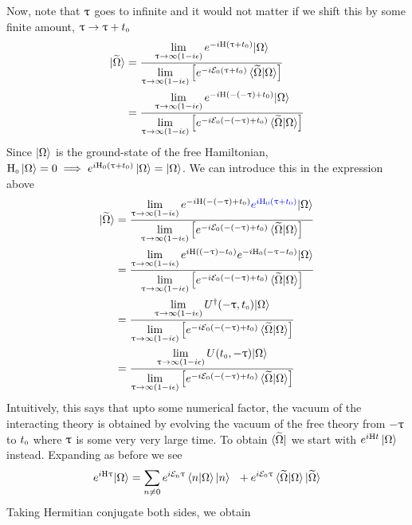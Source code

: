 Now, note that $\uptau$ goes to infinite and it would not matter if we shift this by some finite amount, $\uptau \to \uptau + {t_{\text{\tiny 0}}}$
\begin{align*}
   \ket{\widetilde{\Omega}} &= \frac{\lim\limits_{\uptau \to \infty(1-i\epsilon)}  e^{-i\mathrm{H} (\uptau+{t_{\text{\tiny 0}}})} {\ket{\Omega}}}{\lim\limits_{\uptau \to \infty(1-i\epsilon)} \qty[e^{-i\mathcal E_{\text{\tiny 0}}(\uptau+{t_{\text{\tiny 0}}})} \braket{\widetilde{\Omega}|\Omega}]}  \\
   &= \frac{\lim\limits_{\uptau \to \infty(1-i\epsilon)}  e^{-i\mathrm{H} (-(-\uptau)+{t_{\text{\tiny 0}}})} {\ket{\Omega}}}{\lim\limits_{\uptau \to \infty(1-i\epsilon)} \qty[e^{-i\mathcal E_{\text{\tiny 0}}(-(-\uptau)+{t_{\text{\tiny 0}}})} \braket{\widetilde{\Omega}|\Omega}]}
\end{align*}
Since $\ket{\Omega}$ is the ground-state of the free Hamiltonian, $\mathrm{H}_{\text{\tiny 0}}\ket{\Omega} =0\implies e^{i\mathrm{H}_{\text{\tiny 0}} (\uptau+{t_{\text{\tiny 0}}})}\ket{\Omega} = \ket{\Omega}$. We can introduce this in the expression above 
\begin{align*}
    \ket{\widetilde{\Omega}}&= \frac{\lim\limits_{\ut \to \infty(1-i\epsilon)}  e^{-i\MH (-(-\ut)+\tz)}\mathcolor{blue}{e^{i\MH\tund{0} (\ut+\tz)}} {\vac}  }{\lim\limits_{\ut \to \infty(1-i\epsilon)} \qty[e^{-i\SE\tund{0}(-(-\ut)+\tz)} \braket{\widetilde{\Omega}|\Omega}]}\\ 
    &= \frac{\lim\limits_{\ut \to \infty(1-i\epsilon)}  e^{i\MH ((-\ut)-\tz)}{e^{-i\MH\tund{0} (-\ut-\tz)}} {\vac}  }{\lim\limits_{\ut \to \infty(1-i\epsilon)} \qty[e^{-i\SE\tund{0}(-(-\ut)+\tz)} \braket{\widetilde{\Omega}|\Omega}]}\\
    &=\frac{\lim\limits_{\ut \to \infty(1-i\epsilon)}  U^\dagger (-\ut,\tz) {\vac}  }{\lim\limits_{\ut \to \infty(1-i\epsilon)} \qty[e^{-i\SE\tund{0}(-(-\ut)+\tz)} \braket{\widetilde{\Omega}|\Omega}]}\\
    &=\frac{\lim\limits_{\ut \to \infty(1-i\epsilon)}  U (\tz, -\ut) {\vac}  }{\lim\limits_{\ut \to \infty(1-i\epsilon)} \qty[e^{-i\SE\tund{0}(-(-\ut)+\tz)} \braket{\widetilde{\Omega}|\Omega}]}
\end{align*}
Intuitively, this says that upto some numerical factor, the vacuum of the interacting theory is obtained by evolving the vacuum of the free theory from $-\uptau$ to ${t_{\text{\tiny 0}}}$ where $\uptau$ is some very very large time.  To obtain $\bra{\widetilde{\Omega}}$ we start with $e^{i\mathrm{H} t}\ket{\Omega}$ instead. Expanding as before we see 
\begin{align*}
    e^{i\mathrm{H} \uptau} {\ket{\Omega}} =\sum\limits_{n\neq 0} e^{i\mathcal E_{\text{\tiny n}} \uptau} \braket{n|\Omega} \ket{n} \ \ + e^{i\mathcal E_{\text{\tiny 0}}\uptau} \braket{\widetilde{\Omega}|\Omega}\ket{\widetilde{\Omega}} 
\end{align*}
Taking Hermitian conjugate both sides, we obtain 
